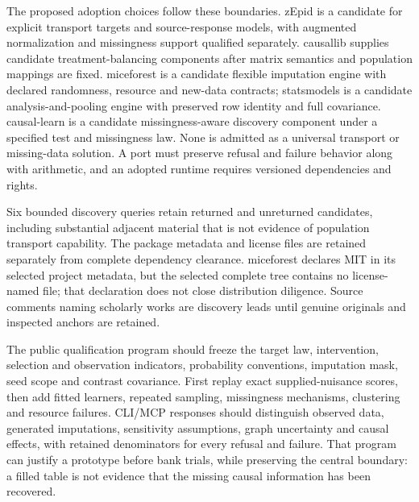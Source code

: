 The proposed adoption choices follow these boundaries. zEpid is a candidate for explicit transport targets and source-response models, with augmented normalization and missingness support qualified separately. causallib supplies candidate treatment-balancing components after matrix semantics and population mappings are fixed. miceforest is a candidate flexible imputation engine with declared randomness, resource and new-data contracts; statsmodels is a candidate analysis-and-pooling engine with preserved row identity and full covariance. causal-learn is a candidate missingness-aware discovery component under a specified test and missingness law. None is admitted as a universal transport or missing-data solution. A port must preserve refusal and failure behavior along with arithmetic, and an adopted runtime requires versioned dependencies and rights.~\citep{exec25_ptm_choice}

Six bounded discovery queries retain returned and unreturned candidates, including substantial adjacent material that is not evidence of population transport capability. The package metadata and license files are retained separately from complete dependency clearance. miceforest declares MIT in its selected project metadata, but the selected complete tree contains no license-named file; that declaration does not close distribution diligence. Source comments naming scholarly works are discovery leads until genuine originals and inspected anchors are retained.~\citep{exec25_ptm_miceforest,exec25_ptm_choice}

The public qualification program should freeze the target law, intervention, selection and observation indicators, probability conventions, imputation mask, seed scope and contrast covariance. First replay exact supplied-nuisance scores, then add fitted learners, repeated sampling, missingness mechanisms, clustering and resource failures. CLI/MCP responses should distinguish observed data, generated imputations, sensitivity assumptions, graph uncertainty and causal effects, with retained denominators for every refusal and failure. That program can justify a prototype before bank trials, while preserving the central boundary: a filled table is not evidence that the missing causal information has been recovered.~\citep{exec25_ptm_choice}

